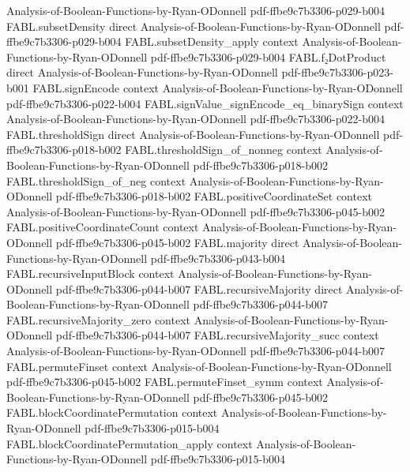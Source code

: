 \begin{theorem}
  {Analysis-of-Boolean-Functions-by-Ryan-ODonnell}
  {pdf-ffbe9c7b3306-p029-b004}
\proofstep
  {FABL.subsetDensity}
  {direct}
  {Analysis-of-Boolean-Functions-by-Ryan-ODonnell}
  {pdf-ffbe9c7b3306-p029-b004}
\proofstep
  {FABL.subsetDensity_apply}
  {context}
  {Analysis-of-Boolean-Functions-by-Ryan-ODonnell}
  {pdf-ffbe9c7b3306-p029-b004}
\proofstep
  {FABL.f₂DotProduct}
  {direct}
  {Analysis-of-Boolean-Functions-by-Ryan-ODonnell}
  {pdf-ffbe9c7b3306-p023-b001}
\proofstep
  {FABL.signEncode}
  {context}
  {Analysis-of-Boolean-Functions-by-Ryan-ODonnell}
  {pdf-ffbe9c7b3306-p022-b004}
\proofstep
  {FABL.signValue_signEncode_eq_binarySign}
  {context}
  {Analysis-of-Boolean-Functions-by-Ryan-ODonnell}
  {pdf-ffbe9c7b3306-p022-b004}
\proofstep
  {FABL.thresholdSign}
  {direct}
  {Analysis-of-Boolean-Functions-by-Ryan-ODonnell}
  {pdf-ffbe9c7b3306-p018-b002}
\proofstep
  {FABL.thresholdSign_of_nonneg}
  {context}
  {Analysis-of-Boolean-Functions-by-Ryan-ODonnell}
  {pdf-ffbe9c7b3306-p018-b002}
\proofstep
  {FABL.thresholdSign_of_neg}
  {context}
  {Analysis-of-Boolean-Functions-by-Ryan-ODonnell}
  {pdf-ffbe9c7b3306-p018-b002}
\proofstep
  {FABL.positiveCoordinateSet}
  {context}
  {Analysis-of-Boolean-Functions-by-Ryan-ODonnell}
  {pdf-ffbe9c7b3306-p045-b002}
\proofstep
  {FABL.positiveCoordinateCount}
  {context}
  {Analysis-of-Boolean-Functions-by-Ryan-ODonnell}
  {pdf-ffbe9c7b3306-p045-b002}
\proofstep
  {FABL.majority}
  {direct}
  {Analysis-of-Boolean-Functions-by-Ryan-ODonnell}
  {pdf-ffbe9c7b3306-p043-b004}
\proofstep
  {FABL.recursiveInputBlock}
  {context}
  {Analysis-of-Boolean-Functions-by-Ryan-ODonnell}
  {pdf-ffbe9c7b3306-p044-b007}
\proofstep
  {FABL.recursiveMajority}
  {direct}
  {Analysis-of-Boolean-Functions-by-Ryan-ODonnell}
  {pdf-ffbe9c7b3306-p044-b007}
\proofstep
  {FABL.recursiveMajority_zero}
  {context}
  {Analysis-of-Boolean-Functions-by-Ryan-ODonnell}
  {pdf-ffbe9c7b3306-p044-b007}
\proofstep
  {FABL.recursiveMajority_succ}
  {context}
  {Analysis-of-Boolean-Functions-by-Ryan-ODonnell}
  {pdf-ffbe9c7b3306-p044-b007}
\proofstep
  {FABL.permuteFinset}
  {context}
  {Analysis-of-Boolean-Functions-by-Ryan-ODonnell}
  {pdf-ffbe9c7b3306-p045-b002}
\proofstep
  {FABL.permuteFinset_symm}
  {context}
  {Analysis-of-Boolean-Functions-by-Ryan-ODonnell}
  {pdf-ffbe9c7b3306-p045-b002}
\proofstep
  {FABL.blockCoordinatePermutation}
  {context}
  {Analysis-of-Boolean-Functions-by-Ryan-ODonnell}
  {pdf-ffbe9c7b3306-p015-b004}
\proofstep
  {FABL.blockCoordinatePermutation_apply}
  {context}
  {Analysis-of-Boolean-Functions-by-Ryan-ODonnell}
  {pdf-ffbe9c7b3306-p015-b004}

\end{theorem}
